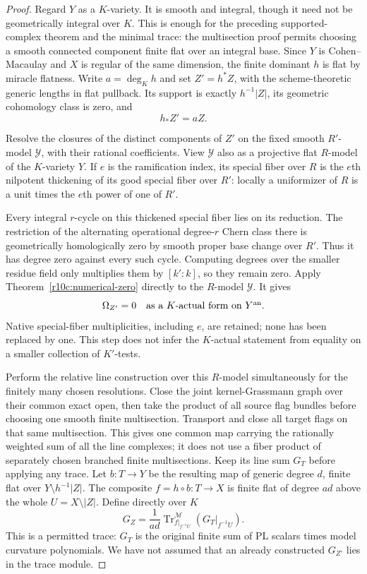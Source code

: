 \begin{proof}
Regard $Y$ as a $K$-variety.  It is smooth and integral, though it
need not be geometrically integral over $K$.  This is enough for
the preceding supported-complex theorem and the minimal trace:
the multisection proof permits choosing a smooth connected component
finite flat over an integral base.  Since $Y$ is Cohen--Macaulay
and $X$ is regular of the same dimension, the finite dominant $h$
is flat by miracle flatness.  Write $a=\deg_K h$ and set $Z'=h^*Z$,
with the scheme-theoretic generic lengths in flat pullback.
Its support is exactly $h^{-1}|Z|$, its geometric cohomology class
is zero, and
\[
                                  h_*Z'=aZ.
\tag{PC12}\label{r11p:finite-cover-cycle-degree}
\]

Resolve the closures of the distinct components of $Z'$ on the
fixed smooth $R'$-model $\mathcal Y$, with their rational
coefficients.  View $\mathcal Y$ also as a projective flat
$R$-model of the $K$-variety $Y$.  If $e$ is the ramification index,
its special fiber over $R$ is the $e$th nilpotent thickening of its
good special fiber over $R'$: locally a uniformizer of $R$ is a
unit times the $e$th power of one of $R'$.

Every integral $r$-cycle on this thickened special fiber lies on
its reduction.  The restriction of the alternating operational
degree-$r$ Chern class there is geometrically homologically zero
by smooth proper base change over $R'$.  Thus it has degree zero
against every such cycle.  Computing degrees over the smaller
residue field only multiplies them by $[k':k]$, so they remain zero.
Apply Theorem~\ref{r10c:numerical-zero} directly to the $R$-model
$\mathcal Y$.  It gives
\[
              \Omega_{Z'}=0
                       \quad\hbox{as a $K$-actual form on $Y^{\rm an}$}.
\]
Native special-fiber multiplicities, including $e$, are retained;
none has been replaced by one.  This step does not infer the
$K$-actual statement from equality on a smaller collection of
$K'$-tests.

Perform the relative line construction over this $R$-model
simultaneously for the finitely many chosen resolutions.  Close the
joint kernel-Grassmann graph over their common exact open, then take
the product of all source flag bundles before choosing one smooth
finite multisection.  Transport and close all target flags on that
same multisection.  This gives one common map carrying the rationally
weighted sum of all the line complexes; it does not use a fiber
product of separately chosen branched finite multisections.
Keep its line sum $G_T$ before applying any trace.  Let $b:T\to Y$
be the resulting map of generic degree $d$, finite flat over
$Y\setminus h^{-1}|Z|$.  The composite
$f=h\circ b:T\to X$ is finite flat of degree $ad$ above the whole
$U=X\setminus|Z|$.  Define directly over $K$
\[
                   G_Z=\frac1{ad}
                       \operatorname{Tr}^{\mathscr M}_{f|_{f^{-1}U}}
                                      (G_T|_{f^{-1}U}).
\tag{PC13}\label{r11p:potential-good-formula}
\]
This is a permitted trace: $G_T$ is the original finite sum of
PL scalars times model curvature polynomials.  We have not assumed
that an already constructed $G_{Z'}$ lies in the trace module.


\end{proof}
